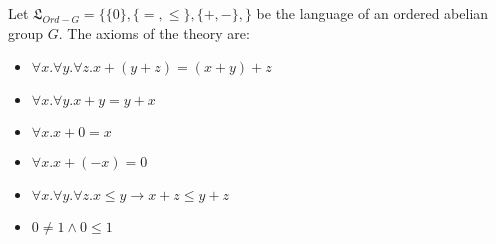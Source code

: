 \begin{definition}
  Let $\mathfrak{L}_{Ord-G} = \{\{0 \}, \{ = , 
  \leq \}, \{+, -\}, \}$ be the 
  language of an ordered abelian group $G$. 
  The axioms of the theory are:
  \begin{itemize}
    \item $\forall x . \forall y . \forall z . x + (y + z) = (x + y) + z$
    \item $\forall x . \forall y .  x + y = y + x$
    \item $\forall x . x + 0 = x$
    \item $\forall x . x + (- x) = 0$
    \item $\forall x . \forall y . \forall z . x \leq y \rightarrow x + z \leq y + z$
    \item $0 \neq 1 \land 0 \leq 1$ 
  \end{itemize}
\end{definition}

